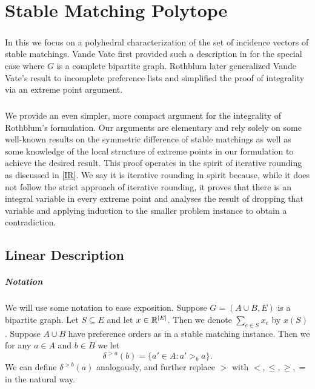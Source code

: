 \chapter{Stable Matching Polytope}
\paragraph{}
In this we focus on a polyhedral characterization of the set of
incidence vectors of stable matchings.  Vande Vate first provided such
a description in \cite{vate1989linear} for the special case where $G$
is a complete bipartite graph.  Rothblum \cite{rothblum1992characterization} later generalized Vande Vate's result to incomplete preference lists and simplified the proof of integrality via an extreme point argument.
\paragraph{}
We provide an even simpler, more compact argument for the integrality of Rothblum's formulation. Our arguments are elementary and rely solely on some well-known results on the symmetric difference of stable matchings as well as some knowledge of the local structure of extreme points in our formulation to achieve the desired result. This proof operates in the spirit of iterative rounding as discussed in \ref{IR}. We say it is iterative rounding in spirit because, while it does not follow the strict approach of iterative rounding, it proves that there is an integral variable in every extreme point and analyses the result of dropping that variable and applying induction to the smaller problem instance to obtain a contradiction.
\section{Linear Description}
\paragraph{Notation}
We will use some notation to ease exposition. Suppose $G=(A\cup B, E)$ is a bipartite graph. Let $S \subseteq E$ and let $x \in \mathbb{R}^{\left|E\right|}$. Then we denote $\sum_{e\in S} x_e$ by $x(S)$. Suppose $A \cup B$ have preference orders as in a stable matching instance. Then we for any $a\in A$ and $b \in B$ we let
$$\delta^{>a}(b) = \{a' \in A: a' >_b a\}.$$
We can define $\delta^{>b}(a)$ analogously, and further replace $>$ with $<, \leq, \geq, =$ in the natural way.
